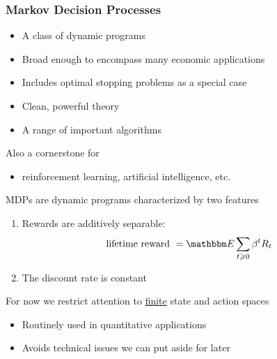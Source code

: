 \begin{frame}
    \frametitle{Markov Decision Processes}    


    \begin{itemize}
        \item A class of dynamic programs
    \vspace{0.5em}
        \item Broad enough to encompass many economic applications
    \vspace{0.5em}
        \item Includes optimal stopping problems as a special case
    \vspace{0.5em}
        \item Clean, powerful theory
    \vspace{0.5em}
        \item A range of important algorithms 
    \end{itemize}

    \vspace{0.5em}
    Also a cornerstone for
    \begin{itemize}
        \item reinforcement learning, artificial intelligence, etc.
    \end{itemize}

\end{frame}


\begin{frame}
    
    MDPs are dynamic programs characterized by two features
    \begin{enumerate}
        \item Rewards are additively separable:
            \begin{equation*}
                \text{lifetime reward }
                = \EE \sum_{t \geq 0} \beta^t R_t
            \end{equation*}
        \item The discount rate is constant
    \end{enumerate}

    \vspace{0.5em}
    \vspace{0.5em}
    For now we restrict attention to \underline{finite} state and action spaces

    \vspace{0.5em}
    \begin{itemize}
        \item Routinely used in quantitative applications
    \vspace{0.5em}
        \item Avoids technical issues we can put aside for later
    \end{itemize}

\end{frame}


